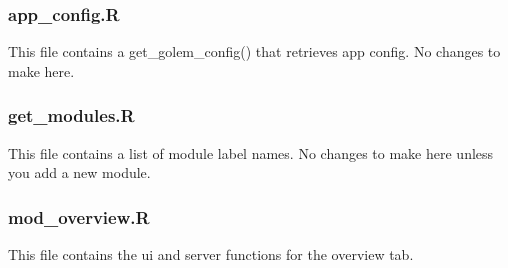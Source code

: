 \documentclass[]{article}
\begin{document}
\hypertarget{app_config.r}{%
\subsubsection{app\_config.R}\label{app_config.r}}

This file contains a get\_golem\_config() that retrieves app config. No
changes to make here.

\hypertarget{get_modules.r}{%
\subsubsection{get\_modules.R}\label{get_modules.r}}

This file contains a list of module label names. No changes to make here
unless you add a new module.

\hypertarget{mod_overview.r}{%
\subsubsection{mod\_overview.R}\label{mod_overview.r}}

This file contains the ui and server functions for the overview tab.
\end{document}
